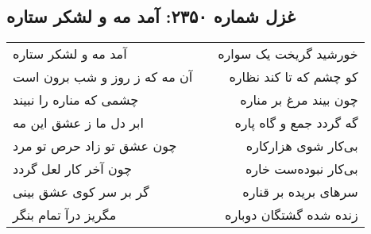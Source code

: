 \begin{center}
\section*{غزل شماره ۲۳۵۰: آمد مه و لشکر ستاره}
\label{sec:2350}
\begin{longtable}{l p{0.5cm} r}
آمد مه و لشکر ستاره
&&
خورشید گریخت یک سواره
\\
آن مه که ز روز و شب برون است
&&
کو چشم که تا کند نظاره
\\
چشمی که مناره را نبیند
&&
چون بیند مرغ بر مناره
\\
ابر دل ما ز عشق این مه
&&
گه گردد جمع و گاه پاره
\\
چون عشق تو زاد حرص تو مرد
&&
بی‌کار شوی هزارکاره
\\
چون آخر کار لعل گردد
&&
بی‌کار نبوده‌ست خاره
\\
گر بر سر کوی عشق بینی
&&
سرهای بریده بر قناره
\\
مگریز درآ تمام بنگر
&&
زنده شده گشتگان دوباره
\\
\end{longtable}
\end{center}
